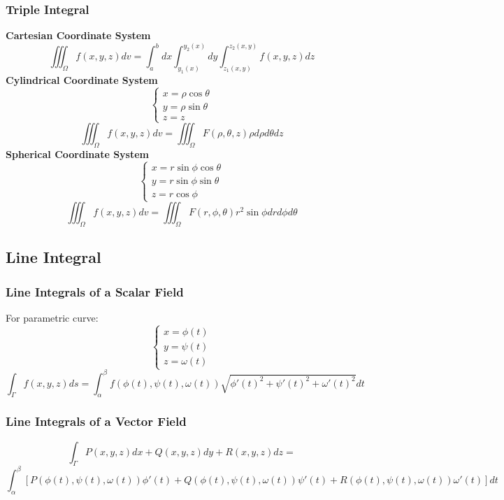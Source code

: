 \documentclass{article}
\begin{document}
\subsubsection{Triple Integral}

\textbf{Cartesian Coordinate System}
\[
    \iiint_\Omega f(x, y, z) dv = \int_a^b dx \int_{y_1(x)}^{y_2(x)} dy \int_{z_1(x, y)}^{z_2(x, y)} f(x, y, z) dz
\]
\textbf{Cylindrical Coordinate System}
\[
    \begin{cases}
        x = \rho \cos \theta \\
        y = \rho \sin \theta \\
        z = z
    \end{cases}
\]
\[
    \iiint_\Omega f(x, y, z) dv = \iiint_\Omega F(\rho, \theta, z) \rho d\rho d\theta dz
\]
\textbf{Spherical Coordinate System}
\[
    \begin{cases}
        x = r \sin \phi \cos \theta \\
        y = r \sin \phi \sin \theta \\
        z = r \cos \phi
    \end{cases}
\]
\[
    \iiint_\Omega f(x, y, z) dv = \iiint_\Omega F(r, \phi, \theta) r^2 \sin \phi dr d\phi d\theta
\]

\subsection{Line Integral}

\subsubsection{Line Integrals of a Scalar Field}

For parametric curve:
\[
    \begin{cases}
        x = \phi(t) \\
        y = \psi(t) \\
        z = \omega(t)
    \end{cases}
\]
\[
    \int_\Gamma f(x, y, z) ds = \int_\alpha^\beta f(\phi(t), \psi(t), \omega(t)) \sqrt{\phi'(t)^2 + \psi'(t)^2 + \omega'(t)^2} dt
\]

\subsubsection{Line Integrals of a Vector Field}

\[
    \int_\Gamma P(x, y, z) dx + Q(x, y, z) dy + R(x, y, z) dz =
\]
\[
    \int_\alpha^\beta \left[P(\phi(t), \psi(t), \omega(t)) \phi'(t) + Q(\phi(t), \psi(t), \omega(t)) \psi'(t) + R(\phi(t), \psi(t), \omega(t)) \omega'(t)\right] dt
\]
\end{document}
